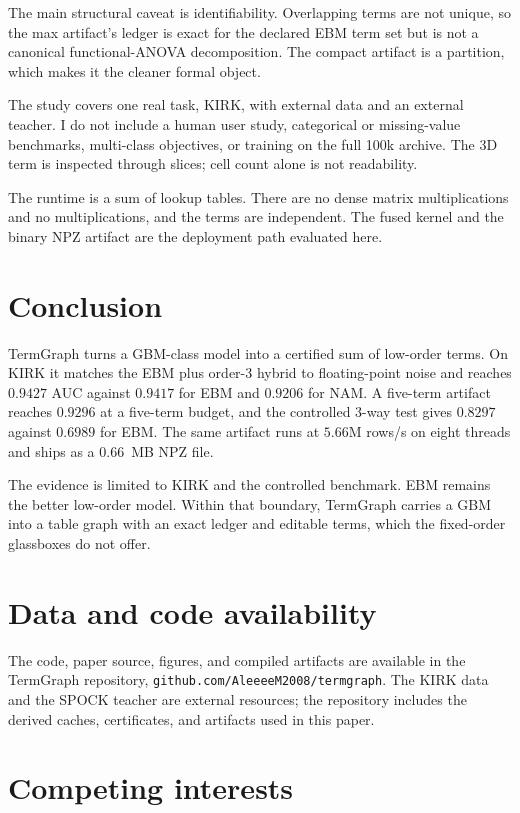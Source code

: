 \documentclass[twoside,11pt]{article}
\begin{document}
The main structural caveat is identifiability. Overlapping terms are not
unique, so the max artifact's ledger is exact for the declared EBM term set but
is not a canonical functional-ANOVA decomposition. The compact artifact is a
partition, which makes it the cleaner formal object.

The study covers one real task, KIRK, with external data and an external
teacher. I do not include a human user study, categorical or missing-value
benchmarks, multi-class objectives, or training on the full 100k archive. The 3D
term is inspected through slices; cell count alone is not readability.

The runtime is a sum of lookup tables. There are no dense matrix
multiplications and no multiplications, and the terms are independent. The
fused kernel and the binary NPZ artifact are the deployment path evaluated here.

\section{Conclusion}

TermGraph turns a GBM-class model into a certified sum of low-order terms. On
KIRK it matches the EBM plus order-3 hybrid to floating-point noise and reaches
$0.9427$ AUC against $0.9417$ for EBM and $0.9206$ for NAM. A five-term artifact
reaches $0.9296$ at a five-term budget, and the controlled 3-way test gives
$0.8297$ against $0.6989$ for EBM. The same artifact runs at $5.66$M rows/s on
eight threads and ships as a $0.66$~MB NPZ file.

The evidence is limited to KIRK and the controlled benchmark. EBM remains the
better low-order model. Within that boundary, TermGraph carries a GBM into a
table graph with an exact ledger and editable terms, which the fixed-order
glassboxes do not offer.

\section*{Data and code availability}

The code, paper source, figures, and compiled artifacts are available in the
TermGraph repository,
\texttt{github.com/\allowbreak AleeeeM2008/\allowbreak termgraph}. The KIRK
data and the SPOCK teacher are external resources; the repository includes the
derived caches, certificates, and artifacts used in this paper.

\section*{Competing interests}
\end{document}
